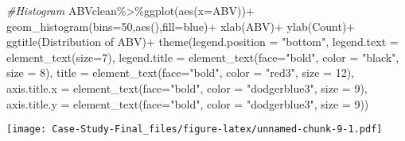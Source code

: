 \documentclass[
]{article}
\newenvironment{Shaded}{\begin{snugshade}}{\end{snugshade}}
\newcommand{\AttributeTok}[1]{\textcolor[rgb]{0.77,0.63,0.00}{#1}}
\newcommand{\CommentTok}[1]{\textcolor[rgb]{0.56,0.35,0.01}{\textit{#1}}}
\newcommand{\DecValTok}[1]{\textcolor[rgb]{0.00,0.00,0.81}{#1}}
\newcommand{\FunctionTok}[1]{\textcolor[rgb]{0.00,0.00,0.00}{#1}}
\newcommand{\NormalTok}[1]{#1}
\newcommand{\SpecialCharTok}[1]{\textcolor[rgb]{0.00,0.00,0.00}{#1}}
\newcommand{\StringTok}[1]{\textcolor[rgb]{0.31,0.60,0.02}{#1}}
\begin{document}
\begin{Shaded}
\begin{Highlighting}[]
\CommentTok{\#Histogram}
\NormalTok{ABVclean}\SpecialCharTok{\%\textgreater{}\%}\FunctionTok{ggplot}\NormalTok{(}\FunctionTok{aes}\NormalTok{(}\AttributeTok{x=}\NormalTok{ABV))}\SpecialCharTok{+} 
  \FunctionTok{geom\_histogram}\NormalTok{(}\AttributeTok{bins=}\DecValTok{50}\NormalTok{,}\FunctionTok{aes}\NormalTok{(),}\AttributeTok{fill=}\StringTok{\textquotesingle{}blue\textquotesingle{}}\NormalTok{)}\SpecialCharTok{+}
  \FunctionTok{xlab}\NormalTok{(}\StringTok{\textquotesingle{}ABV\textquotesingle{}}\NormalTok{)}\SpecialCharTok{+}
  \FunctionTok{ylab}\NormalTok{(}\StringTok{\textquotesingle{}Count\textquotesingle{}}\NormalTok{)}\SpecialCharTok{+}
  \FunctionTok{ggtitle}\NormalTok{(}\StringTok{\textquotesingle{}Distribution of ABV\textquotesingle{}}\NormalTok{)}\SpecialCharTok{+}
  \FunctionTok{theme}\NormalTok{(}\AttributeTok{legend.position =} \StringTok{"bottom"}\NormalTok{,}
        \AttributeTok{legend.text =} \FunctionTok{element\_text}\NormalTok{(}\AttributeTok{size=}\DecValTok{7}\NormalTok{),}
        \AttributeTok{legend.title =} \FunctionTok{element\_text}\NormalTok{(}\AttributeTok{face=}\StringTok{"bold"}\NormalTok{, }\AttributeTok{color =} \StringTok{"black"}\NormalTok{, }\AttributeTok{size =} \DecValTok{8}\NormalTok{),}
        \AttributeTok{title =} \FunctionTok{element\_text}\NormalTok{(}\AttributeTok{face=}\StringTok{"bold"}\NormalTok{, }\AttributeTok{color =} \StringTok{"red3"}\NormalTok{, }\AttributeTok{size =} \DecValTok{12}\NormalTok{),}
        \AttributeTok{axis.title.x =} \FunctionTok{element\_text}\NormalTok{(}\AttributeTok{face=}\StringTok{"bold"}\NormalTok{, }\AttributeTok{color =} \StringTok{"dodgerblue3"}\NormalTok{, }\AttributeTok{size =} \DecValTok{9}\NormalTok{),}
        \AttributeTok{axis.title.y =} \FunctionTok{element\_text}\NormalTok{(}\AttributeTok{face=}\StringTok{"bold"}\NormalTok{, }\AttributeTok{color =} \StringTok{"dodgerblue3"}\NormalTok{, }\AttributeTok{size =} \DecValTok{9}\NormalTok{))}
\end{Highlighting}
\end{Shaded}

\texttt{[image: Case-Study-Final\_files/figure-latex/unnamed-chunk-9-1.pdf]}
\end{document}
